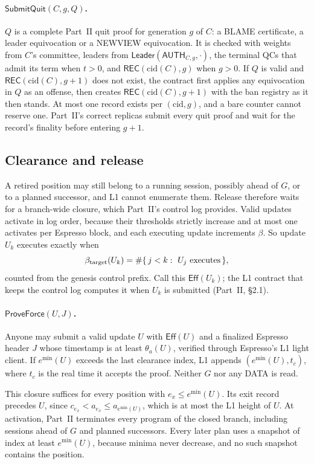 \documentclass[11pt,a4paper]{article}
\newcommand{\tagg}[1]{\mathsf{#1}}
\newcommand{\emin}{e^{\min}}
\newcommand{\cid}{\mathrm{cid}}
\begin{document}
\paragraph{$\tagg{SubmitQuit}(C,g,Q)$.} $Q$ is a complete Part~II quit
proof for generation $g$ of $C$: a BLAME certificate, a leader
equivocation or a NEWVIEW equivocation. It is checked with weights from
$C$'s committee, leaders from $\tagg{Leader}(\tagg{AUTH}_{C,g},\cdot)$, the
terminal QCs that admit its term when $t>0$, and $\tagg{REC}(\cid(C),g)$
when $g>0$. If $Q$ is valid and $\tagg{REC}(\cid(C),g+1)$ does not exist,
the contract first applies any equivocation in $Q$ as an offense, then
creates $\tagg{REC}(\cid(C),g+1)$ with the ban registry as it then stands.
At most one record exists per $(\cid,g)$, and a bare counter cannot
reserve one. Part~II's correct replicas submit every quit proof and wait
for the record's finality before entering $g+1$.

\subsection{Clearance and release}
\label{sec:release}
A retired position may still belong to a running session, possibly ahead
of $G$, or to a planned successor, and L1 cannot enumerate them. Release
therefore waits for a branch-wide closure, which Part~II's control log
provides. Valid updates activate in log order, because their thresholds
strictly increase and at most one activates per Espresso block, and each
executing update increments $\beta$. So update $U_k$ executes exactly when
\begin{equation}\label{eq:eff}
 \beta_{\rm target}(U_k)=\#\{\,j<k:\ U_j\text{ executes}\,\},
\end{equation}
counted from the genesis control prefix. Call this $\tagg{Eff}(U_k)$; the
L1 contract that keeps the control log computes it when $U_k$ is
submitted (Part~II, \S2.1).

\paragraph{$\tagg{ProveForce}(U,J)$.} Anyone may submit a valid update $U$
with $\tagg{Eff}(U)$ and a finalized Espresso header $J$ whose timestamp
is at least $\theta_a(U)$, verified through Espresso's L1 light client.
If $\emin(U)$ exceeds the last clearance index, L1 appends
$(\emin(U),t_c)$, where $t_c$ is the real time it accepts the proof.
Neither $G$ nor any DATA is read.

This closure suffices for every position with $e_x\le\emin(U)$. Its exit
record precedes $U$, since
$c_{e_x}<a_{e_x}\le a_{\emin(U)}$, which is at most the L1 height of $U$.
At activation, Part~II terminates every program of the closed branch,
including sessions ahead of $G$ and planned successors. Every later plan
uses a snapshot of index at least $\emin(U)$, because minima never
decrease, and no such snapshot contains the position.
\end{document}
